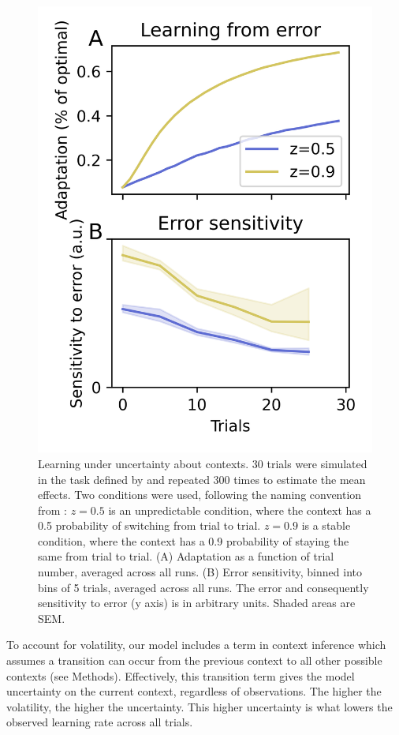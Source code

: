 \documentclass[a4paper,doc,floatsintext,natbib]{apa6}
\begin{document}
\begin{figure}
\centering
\includegraphics{./figures/figure_3.png}
\caption{Learning under uncertainty about contexts. 30 trials were simulated in the task defined by \cite{Herzfeld_memory_2014} and repeated 300 times to estimate the mean effects. Two conditions were used, following the naming convention from \cite{Herzfeld_memory_2014}: $z=0.5$ is an unpredictable condition, where the context has a 0.5 probability of switching from trial to trial. $z=0.9$ is a stable condition, where the context has a 0.9 probability of staying the same from trial to trial. (A) Adaptation as a function of trial number, averaged across all runs. (B) Error sensitivity, binned into bins of 5 trials, averaged across all runs. The error and consequently sensitivity to error (y axis) is in arbitrary units. Shaded areas are SEM.}
\label{fig:herzfeld-2014}
\end{figure}

To account for volatility, our model includes a term in context inference which assumes a transition can occur from the previous context to all other possible contexts (see Methods). Effectively, this transition term gives the model uncertainty on the current context, regardless of observations. The higher the volatility, the higher the uncertainty. This higher uncertainty is what lowers the observed learning rate across all trials.
\end{document}
